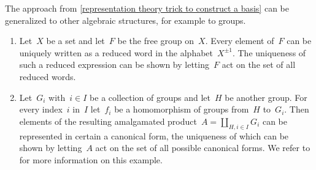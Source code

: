 \begin{remark}
	The approach from \cref{representation theory trick to construct a basis} can be generalized to other algebraic structures, for example to groups.
	\begin{enumerate}
		\item
			Let~$X$ be a set and let~$F$ be the free group on~$X$.
			Every element of~$F$ can be uniquely written as a reduced word in the alphabet~$X^{\pm 1}$.
			The uniqueness of such a reduced expression can be shown by letting~$F$ act on the set of all reduced words.
		\item
			Let~$G_i$ with~$i \in I$ be a collection of groups and let~$H$ be another group.
			For every index~$i$ in~$I$ let~$f_i$ be a homomorphism of groups from~$H$ to~$G_i$.
			Then elements of the resulting amalgamated product~$A = \coprod_{H,i \in I} G_i$ can be represented in certain a canonical form, the uniqueness of which can be shown by letting~$A$ act on the set of all possible canonical forms.
			We refer to \cite[\S 1.2]{serre_trees} for more information on this example.
	\end{enumerate}
\end{remark}


%


